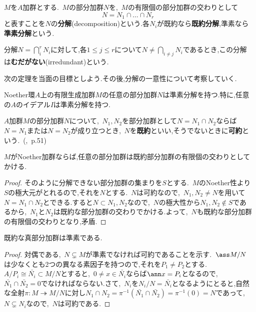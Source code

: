 \begin{defi}[準素分解]
	$M$を$A$加群とする.~$M$の部分加群$N$を,~$M$の有限個の部分加群の交わりとして
	\[N=N_1\cap\dots\cap N_r\]
	と表すことを$N$の\textbf{分解}(decomposition)という.各$N_i$が既約なら\textbf{既約分解},準素なら\textbf{準素分解}という.
\end{defi}

分解$N=\bigcap_{i}^r N_i$に対して,各$1\leq j\leq r$について$N\neq \bigcap_{i\neq j}N_i$であるとき,この分解は\textbf{むだがない}(irredundant)という.

次の定理を当面の目標としよう.その後,分解の一意性について考察していく.

\begin{thm}\label{thm:Laker-Noetherの分解定理}
	Noether環$A$上の有限生成加群$M$の任意の部分加群$N$は準素分解を持つ.特に,任意の$A$のイデアル$I$は準素分解を持つ.
\end{thm}

\begin{defi}
	$A$加群$M$の部分加群$N$について,~$N_1,N_2$を部分加群として$N=N_1\cap N_2$ならば$N=N_1$または$N=N_2$が成り立つとき,~$N$を\textbf{既約}といい,そうでないときに\textbf{可約}という.~(\cite{matsu},~p.51)
\end{defi}

\begin{lem}\label{lem:既約分解できる}
	$M$がNoether加群ならば,任意の部分加群は既約部分加群の有限個の交わりとしてかける.
\end{lem}
\begin{proof}
	そのように分解できない部分加群の集まりを$S$とする.~$M$のNoether性より$S$の極大元がとれるので,それを$N$とする.~$N$は可約なので,~$N_1,N_2\neq N$を用いて$N=N_1\cap N_2$とできる.すると$N\subset N
	_1,N_2$なので,~$N$の極大性から$N_1,N_2\not\in S$であるから,~$N_1$と$N_2$は既約な部分加群の交わりでかける.よって,~$N$も既約な部分加群の有限個の交わりとなり,矛盾.
\end{proof}
\begin{lem}\label{lem:既約なら準素}
	既約な真部分加群は準素である.
\end{lem}
\begin{proof}
	対偶である,~$N\subsetneq M$が準素でなければ可約であることを示す.~$\ass M/N$は少なくとも2つの異なる素因子を持つので,それを$ P_1\neq P_2$とする.~$A/ P_i\cong\bar{N_i}\subset M/N$とすると,~$0\neq x\in\bar{N_i}$ならば$\ann x= P_i$となるので,~$\bar{N_1}\cap\bar{N_2}=0$でなければならない.さて,~$N_i$を$N_i/N=\bar{N_i}$となるようにとると,自然な全射$\pi:M\twoheadrightarrow M/N$に対し$N_1\cap N_2=\pi^{-1}(\bar{N_1}\cap\bar{N_2})=\pi^{-1}(0)=N$であって,~$N\subsetneq N_i$なので,~$N$は可約である.
\end{proof}

